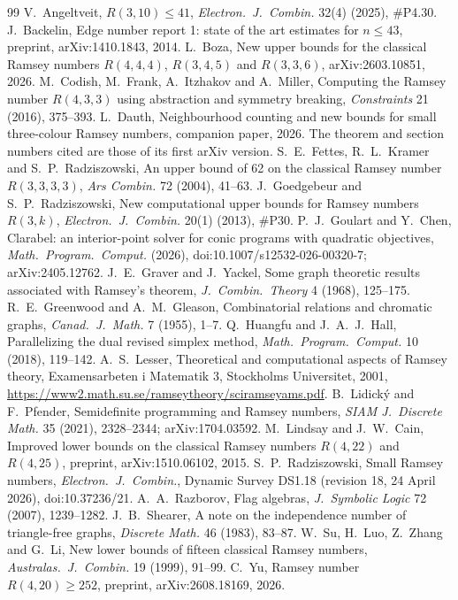\documentclass[11pt]{article}
\theoremstyle{spacedplain}
\theoremstyle{spaceddef}
\theoremstyle{spacedremark}
\begin{document}
\begin{thebibliography}{99}\small
{} V.~Angeltveit, $R(3,10)\le 41$, \emph{Electron.\ J.\ Combin.} 32(4) (2025), \#P4.30.
 J.~Backelin, Edge number report 1: state of the art estimates for $n\le 43$, preprint, arXiv:1410.1843, 2014.
 L.~Boza, New upper bounds for the classical Ramsey numbers $R(4,4,4)$, $R(3,4,5)$ and $R(3,3,6)$, arXiv:2603.10851, 2026.
 M.~Codish, M.~Frank, A.~Itzhakov and A.~Miller, Computing the Ramsey number $R(4,3,3)$ using abstraction and symmetry breaking, \emph{Constraints} 21 (2016), 375--393.
 L.~Dauth, Neighbourhood counting and new bounds for small three-colour Ramsey numbers, companion paper, 2026. The theorem and section numbers cited are those of its first arXiv version.
 S.~E.~Fettes, R.~L.~Kramer and S.~P.~Radziszowski, An upper bound of 62 on the classical Ramsey number $R(3,3,3,3)$, \emph{Ars Combin.} 72 (2004), 41--63.
 J.~Goedgebeur and S.~P.~Radziszowski, New computational upper bounds for Ramsey numbers $R(3,k)$, \emph{Electron.\ J.\ Combin.} 20(1) (2013), \#P30.
 P.~J.~Goulart and Y.~Chen, Clarabel: an interior-point solver for conic programs with quadratic objectives, \emph{Math.\ Program.\ Comput.} (2026), doi:10.1007/s12532-026-00320-7; arXiv:2405.12762.
 J.~E.~Graver and J.~Yackel, Some graph theoretic results associated with Ramsey's theorem, \emph{J.\ Combin.\ Theory} 4 (1968), 125--175.
 R.~E.~Greenwood and A.~M.~Gleason, Combinatorial relations and chromatic graphs, \emph{Canad.\ J.\ Math.} 7 (1955), 1--7.
 Q.~Huangfu and J.~A.~J.~Hall, Parallelizing the dual revised simplex method, \emph{Math.\ Program.\ Comput.} 10 (2018), 119--142.
 A.~S.~Lesser, Theoretical and computational aspects of Ramsey theory, Examensarbeten i Matematik 3, Stockholms Universitet, 2001, \url{https://www2.math.su.se/ramseytheory/sciramseyams.pdf}.
 B.~Lidick\'y and F.~Pfender, Semidefinite programming and Ramsey numbers, \emph{SIAM J.\ Discrete Math.} 35 (2021), 2328--2344; arXiv:1704.03592.
 M.~Lindsay and J.~W.~Cain, Improved lower bounds on the classical Ramsey numbers $R(4,22)$ and $R(4,25)$, preprint, arXiv:1510.06102, 2015.
 S.~P.~Radziszowski, Small Ramsey numbers, \emph{Electron.\ J.\ Combin.}, Dynamic Survey DS1.18 (revision 18, 24 April 2026), doi:10.37236/21.
 A.~A.~Razborov, Flag algebras, \emph{J.\ Symbolic Logic} 72 (2007), 1239--1282.
 J.~B.~Shearer, A note on the independence number of triangle-free graphs, \emph{Discrete Math.} 46 (1983), 83--87.
 W.~Su, H.~Luo, Z.~Zhang and G.~Li, New lower bounds of fifteen classical Ramsey numbers, \emph{Australas.\ J.\ Combin.} 19 (1999), 91--99.
 C.~Yu, Ramsey number $R(4,20)\ge 252$, preprint, arXiv:2608.18169, 2026.
\end{thebibliography}
\end{document}
